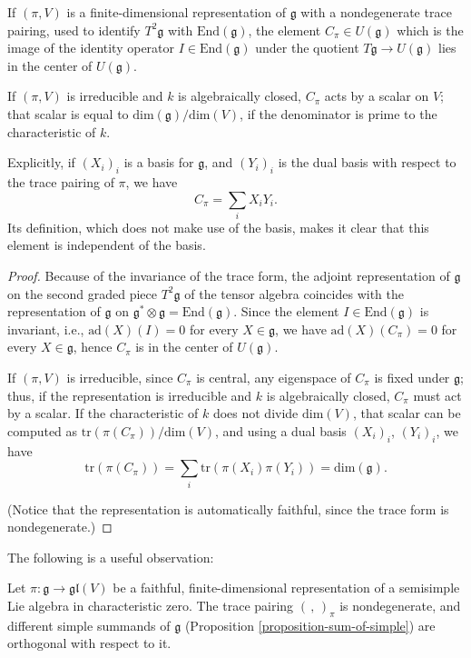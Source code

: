 \begin{proposition}
\label{proposition-Casimir}
If  $(\pi, V)$ is a finite-dimensional representation of $\mathfrak g$ with a nondegenerate trace pairing, used to identify $T^2\mathfrak g$ with $\text{End}(\mathfrak g)$, the element $C_\pi \in U(\mathfrak g)$ which is the image of the identity operator $I\in \text{End}(\mathfrak g)$ under the quotient $T\mathfrak g \to U(\mathfrak g)$ lies in the center of $U(\mathfrak g)$.

If $(\pi, V)$ is irreducible and $k$ is algebraically closed, $C_\pi$ acts by a scalar on $V$; that scalar is equal to $\text{dim}(\mathfrak g)/\text{dim}(V)$, if the denominator is prime to the characteristic of $k$.
\end{proposition}

Explicitly, if $(X_i)_i$ is a basis for $\mathfrak g$, and $(Y_i)_i$ is the dual basis with respect to the trace pairing of $\pi$, we have 
$$C_\pi=\sum_i X_i Y_i.$$
Its definition, which does not make use of the basis, makes it clear that this element is independent of the basis.


\begin{proof}
Because of the invariance of the trace form, the adjoint representation of $\mathfrak g$ on the second graded piece $T^2\mathfrak g$ of the tensor algebra coincides with the representation of $\mathfrak g$ on $\mathfrak g^*\otimes \mathfrak g = \text{End}(\mathfrak g)$. Since the element $I\in \text{End}(\mathfrak g)$ is invariant, i.e., $\text{ad}(X)(I) = 0$ for every $X \in \mathfrak g$, we have $\text{ad}(X)(C_\pi) = 0$ for every $X \in \mathfrak g$, hence $C_\pi$ is in the center of $U(\mathfrak g)$.

If $(\pi,V)$ is irreducible, since $C_\pi$ is central, any eigenspace of $C_\pi$ is fixed under $\mathfrak g$; thus, if the representation is irreducible and $k$ is algebraically closed, $C_\pi$ must act by a scalar. If the characteristic of $k$ does not divide $\text{dim}(V)$, that scalar can be computed as $\text{tr}(\pi(C_\pi))/\text{dim}(V)$, and using a dual basis $(X_i)_i$, $(Y_i)_i$, we have
$$ \text{tr}(\pi(C_\pi)) = \sum_i \text{tr}(\pi(X_i)\pi(Y_i)) = \text{dim}(\mathfrak g).$$

(Notice that the representation is automatically faithful, since the trace form is nondegenerate.)
\end{proof}

The following is a useful observation:

\begin{lemma}
\label{lemma-tracepairing-nondegenerate}
 Let $\pi:\mathfrak g \to \mathfrak{gl}(V)$ be a faithful, finite-dimensional representation of a semisimple Lie algebra in characteristic zero. The trace pairing  $(\, , \, )_\pi$ is nondegenerate, and different simple summands of $\mathfrak g$ (Proposition \ref{proposition-sum-of-simple}) are orthogonal with respect to it.
\end{lemma}



